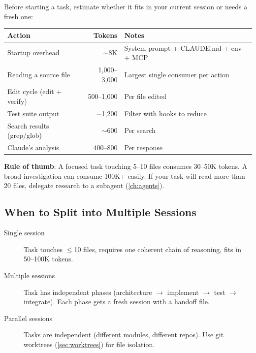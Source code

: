 
Before starting a task, estimate whether it fits in your current
session or needs a fresh one:

\begin{fullwidth}
{\small
\begin{tabular}{@{}lrp{6cm}@{}}
\toprule
\textbf{Action} & \textbf{Tokens} & \textbf{Notes} \\
\midrule
Startup overhead & $\sim$8K & System prompt + CLAUDE.md + env + MCP \\
Reading a source file & 1,000--3,000 & Largest single consumer per action \\
Edit cycle (edit + verify) & 500--1,000 & Per file edited \\
Test suite output & $\sim$1,200 & Filter with hooks to reduce \\
Search results (grep/glob) & $\sim$600 & Per search \\
Claude's analysis & 400--800 & Per response \\
\bottomrule
\end{tabular}
}
\end{fullwidth}

\noindent\textbf{Rule of thumb}: A focused task touching 5--10 files
consumes 30--50K tokens. A broad investigation can consume 100K+ easily.
If your task will read more than 20 files, delegate research to
a subagent (\cref{ch:agents}).

\subsection*{When to Split into Multiple Sessions}

\begin{description}
  \item[Single session] Task touches $\leq$10 files, requires one
    coherent chain of reasoning, fits in 50--100K tokens.
  \item[Multiple sessions] Task has independent phases
    (architecture $\rightarrow$ implement $\rightarrow$ test $\rightarrow$
    integrate). Each phase gets a fresh session with a handoff file.
  \item[Parallel sessions] Tasks are independent (different modules,
    different repos). Use git worktrees (\cref{sec:worktrees}) for
    file isolation.
\end{description}

